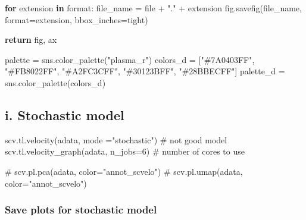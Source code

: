\documentclass[
  letterpaper,
  DIV=11,
  numbers=noendperiod]{scrreprt}
\newenvironment{Shaded}{\begin{snugshade}}{\end{snugshade}}
\newcommand{\BuiltInTok}[1]{\textcolor[rgb]{0.00,0.23,0.31}{#1}}
\newcommand{\CommentTok}[1]{\textcolor[rgb]{0.37,0.37,0.37}{#1}}
\newcommand{\ControlFlowTok}[1]{\textcolor[rgb]{0.00,0.23,0.31}{\textbf{#1}}}
\newcommand{\DecValTok}[1]{\textcolor[rgb]{0.68,0.00,0.00}{#1}}
\newcommand{\KeywordTok}[1]{\textcolor[rgb]{0.00,0.23,0.31}{\textbf{#1}}}
\newcommand{\NormalTok}[1]{\textcolor[rgb]{0.00,0.23,0.31}{#1}}
\newcommand{\OperatorTok}[1]{\textcolor[rgb]{0.37,0.37,0.37}{#1}}
\newcommand{\StringTok}[1]{\textcolor[rgb]{0.13,0.47,0.30}{#1}}
\begin{document}
\begin{Shaded}
\begin{Highlighting}[]
    \ControlFlowTok{for}\NormalTok{ extension }\KeywordTok{in} \BuiltInTok{format}\NormalTok{:}
\NormalTok{        file\_name }\OperatorTok{=} \BuiltInTok{file} \OperatorTok{+} \StringTok{"."} \OperatorTok{+}\NormalTok{ extension}
\NormalTok{        fig.savefig(file\_name, }\BuiltInTok{format}\OperatorTok{=}\NormalTok{extension, bbox\_inches}\OperatorTok{=}\StringTok{\textquotesingle{}tight\textquotesingle{}}\NormalTok{)}
    
    \ControlFlowTok{return}\NormalTok{ fig, ax  }


\NormalTok{palette }\OperatorTok{=}\NormalTok{ sns.color\_palette(}\StringTok{"plasma\_r"}\NormalTok{)}
\NormalTok{colors\_d }\OperatorTok{=}\NormalTok{ [}\StringTok{"\#7A0403FF"}\NormalTok{, }\StringTok{"\#FB8022FF"}\NormalTok{, }\StringTok{"\#A2FC3CFF"}\NormalTok{, }\StringTok{"\#30123BFF"}\NormalTok{, }\StringTok{"\#28BBECFF"}\NormalTok{]}
\NormalTok{palette\_d }\OperatorTok{=}\NormalTok{ sns.color\_palette(colors\_d)}
\end{Highlighting}
\end{Shaded}

\subsection{i. Stochastic model}\label{i.-stochastic-model}

\begin{Shaded}
\begin{Highlighting}[]
\NormalTok{scv.tl.velocity(adata, mode }\OperatorTok{=}\StringTok{"stochastic"}\NormalTok{) }\CommentTok{\# not good model}
\NormalTok{scv.tl.velocity\_graph(adata, n\_jobs}\OperatorTok{=}\DecValTok{6}\NormalTok{) }\CommentTok{\# number of cores to use}

\CommentTok{\# scv.pl.pca(adata, color="annot\_scvelo")}
\CommentTok{\# scv.pl.umap(adata, color="annot\_scvelo")}
\end{Highlighting}
\end{Shaded}

\subsubsection{Save plots for stochastic
model}\label{save-plots-for-stochastic-model}
\end{document}

